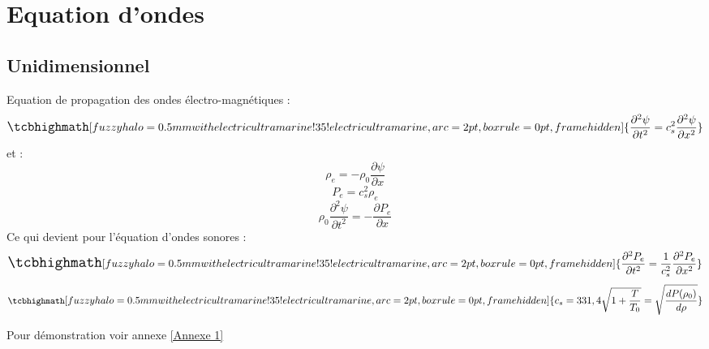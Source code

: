 \section{Equation d'ondes}
\subsection{Unidimensionnel}
Equation de propagation des ondes électro-magnétiques :
\begin{equation}
    \large
    \tcbhighmath[fuzzy halo=0.5mm with electricultramarine!35!electricultramarine,arc=2pt,
    boxrule=0pt,frame hidden]{ 
        \frac{\partial^{2} \psi}{\partial t^{2}} = c_{s}^{2}\frac{\partial^{2} \psi}{\partial x^{2}}
    } \label{eq propagation}
    \normalsize
\end{equation}
et : 
\begin{equation}
    \label{eq 1}
    \rho_{e} = -\rho_{0}\frac{\partial \psi }{\partial x}  
\end{equation}
\begin{equation}
    \label{eq 2}
    P_{e} = c_{s}^{2}\rho_{e}
\end{equation}
\begin{equation}
    \label{eq 3}
    \rho_{0} \frac{\partial^{2} \psi}{\partial t^{2}} = -\frac{\partial P_{e}}{\partial x}
\end{equation}
Ce qui devient pour l'équation d'ondes sonores :
\begin{equation}
    \Large
    \tcbhighmath[fuzzy halo=0.5mm with electricultramarine!35!electricultramarine,arc=2pt,
    boxrule=0pt,frame hidden]{ 
        \frac{\partial^{2} P_{e}}{\partial t^{2}} = \frac{1}{c_{s}^{2}}\frac{\partial^{2} P_{e}}{\partial x^{2}}
     } \nonumber
    \normalsize
\end{equation}
\vfil
\begin{equation}
    \small
    \tcbhighmath[fuzzy halo=0.5mm with electricultramarine!35!electricultramarine,arc=2pt,
    boxrule=0pt,frame hidden]{ 
        c_{s} = 331,4\sqrt{1+\frac{T}{T_{0}}} = \sqrt{\frac{dP(\rho_{0})}{d\rho}}
     } \nonumber
    \normalsize
\end{equation}
\vfill
\begin{center}
    \small{Pour démonstration voir annexe \ref{Annexe 1}}
\end{center}
\newpage
